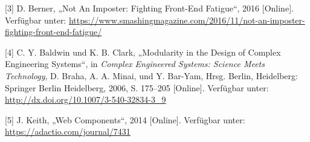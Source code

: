 \documentclass[ngerman,]{assets/latex/ieee}
\begin{document}
\hypertarget{ref-Berner2016}{}
{[}3{]} D. Berner, „Not An Imposter: Fighting Front-End Fatigue``, 2016
{[}Online{]}. Verfügbar unter:
\url{https://www.smashingmagazine.com/2016/11/not-an-imposter-fighting-front-end-fatigue/}

\hypertarget{ref-Baldwin2006}{}
{[}4{]} C. Y. Baldwin und K. B. Clark, „Modularity in the Design of
Complex Engineering Systems``, in \emph{Complex Engineered Systems:
Science Meets Technology}, D. Braha, A. A. Minai, und Y. Bar-Yam, Hrsg.
Berlin, Heidelberg: Springer Berlin Heidelberg, 2006, S. 175--205
{[}Online{]}. Verfügbar unter:
\url{http://dx.doi.org/10.1007/3-540-32834-3_9}

\hypertarget{ref-Keith2014}{}
{[}5{]} J. Keith, „Web Components``, 2014 {[}Online{]}. Verfügbar unter:
\url{https://adactio.com/journal/7431}
\end{document}
